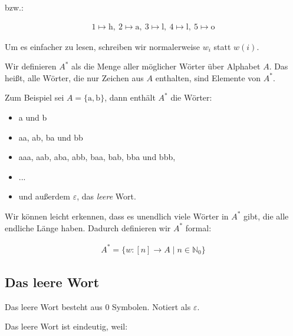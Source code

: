 \documentclass[12pt,a4paper,oneside]{article}
\newcommand{\emptyline}{\hspace*{\fill}}
\newcommand{\N}{\mathbb{N}}
\begin{document}
            bzw.:

            \vspace{-1em}
            \begin{align*}
                1 \mapsto \text{h},\ 2 \mapsto \text{a},\ 3 \mapsto \text{l},\ 4 \mapsto \text{l},\ 5 \mapsto \text{o}
            \end{align*}

            Um es einfacher zu lesen, schreiben wir normalerweise $w_i$ statt $w(i)$.

            \emptyline

            Wir definieren $A^*$ als die Menge aller möglicher Wörter über Alphabet $A$.
            Das heißt, alle Wörter, die nur Zeichen aus $A$ enthalten, sind Elemente von $A^*$.

            \emptyline

            Zum Beispiel sei $A = \{\text{a}, \text{b}\}$, dann enthält $A^*$ die Wörter:

            \begin{itemize}
                \item a und b
                \item aa, ab, ba und bb
                \item aaa, aab, aba, abb, baa, bab, bba und bbb,
                \item ...
                \item und außerdem $\varepsilon$, das \textit{leere} Wort.
            \end{itemize}

            Wir können leicht erkennen, dass es unendlich viele Wörter in $A^*$ gibt, die alle endliche Länge haben.
            Dadurch definieren wir $A^*$ formal:

            \vspace{-1em}
            \begin{align*}
                A^* = \{w: [n] \to A \;|\; n \in \N_0\}
            \end{align*}

        \subsection{Das leere Wort}

            Das leere Wort besteht aus 0 Symbolen.
            Notiert als $\varepsilon$.

            \emptyline

            Das leere Wort ist eindeutig, weil:
\end{document}
